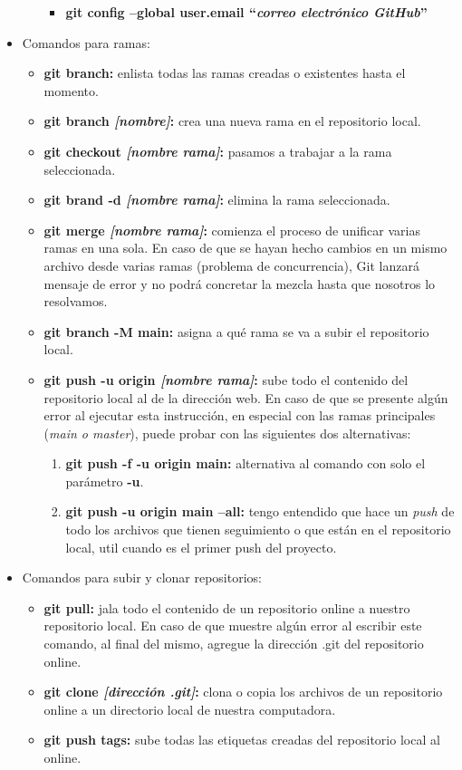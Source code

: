 \begin{itemize}
\begin{itemize}
\begin{itemize}
            \item \textbf{git config –global user.email “\textit{correo electrónico GitHub}”}
        \end{itemize}
    \end{itemize}
    \item Comandos para ramas:
    \begin{itemize}
        \item \textbf{git branch:} enlista todas las ramas creadas o existentes hasta el momento.
        \item \textbf{git branch \textit{[nombre]}:} crea una nueva rama en el repositorio local.
        \item \textbf{git checkout \textit{[nombre rama]}:} pasamos a trabajar a la rama seleccionada.
        \item \textbf{git brand -d \textit{[nombre rama]}:} elimina la rama seleccionada.
        \item \textbf{git merge \textit{[nombre rama]}:} comienza el proceso de unificar varias ramas en una sola. En caso de que se hayan hecho cambios en un mismo archivo desde varias ramas (problema de concurrencia), Git lanzará mensaje de error y no podrá concretar la mezcla hasta que nosotros lo resolvamos.
        \item \textbf{git branch -M main: }asigna a qué rama se va a subir el repositorio local.
        \item \textbf{git push -u origin \textit{[nombre rama]}:} sube todo el contenido del repositorio local al de la dirección web. En caso de que se presente algún error al ejecutar esta instrucción, en especial con las ramas principales (\textit{main o master}), puede probar con las siguientes dos alternativas:
        \begin{enumerate}
        		\item \textbf{git push -f -u origin main:} alternativa al comando con solo el parámetro \textbf{-u}.
        		\item \textbf{git push -u origin main --all:} tengo entendido que hace un \textit{push} de todo los archivos que tienen seguimiento o que están en el repositorio local, util cuando es el primer push del proyecto.
        \end{enumerate}
    \end{itemize}
    \item Comandos para subir y clonar repositorios:
    \begin{itemize}
        \item \textbf{git pull:} jala todo el contenido de un repositorio online a nuestro repositorio local. En caso de que muestre algún error al escribir este comando, al final del mismo, agregue la dirección .git del repositorio online.
        \item \textbf{git clone \textit{[dirección .git]}:} clona o copia los archivos de un repositorio online a un directorio local de nuestra computadora.
        \item \textbf{git push tags: }sube todas las etiquetas creadas del repositorio local al online.
    \end{itemize}
\end{itemize}
